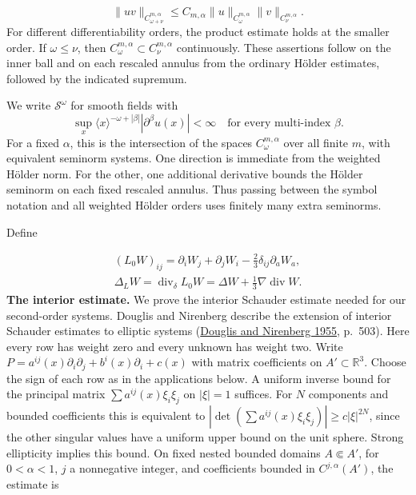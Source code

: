 \documentclass[
  english,
  11pt,
  reqno]{amsart}
\begin{document}
\label{eq:online-chart-weighted-product} \[
\|uv\|_{C^{m,\alpha}_{\omega+\nu}}
\le C_{m,\alpha}\|u\|_{C^{m,\alpha}_\omega}
\|v\|_{C^{m,\alpha}_\nu}.
\] For different differentiability orders, the product estimate holds at
the smaller order. If \(\omega\le\nu\), then
\(C^{m,\alpha}_\omega\subset C^{m,\alpha}_\nu\) continuously. These
assertions follow on the inner ball and on each rescaled annulus from
the ordinary Hölder estimates, followed by the indicated supremum.

We write \(\mathscr S^\omega\) for smooth fields with \[
\sup_x\langle x\rangle^{-\omega+|\beta|}
|\partial^\beta u(x)|<\infty
\quad\text{for every multi-index }\beta.
\] For a fixed \(\alpha\), this is the intersection of the spaces
\(C^{m,\alpha}_\omega\) over all finite \(m\), with equivalent seminorm
systems. One direction is immediate from the weighted Hölder norm. For
the other, one additional derivative bounds the Hölder seminorm on each
fixed rescaled annulus. Thus passing between the symbol notation and all
weighted Hölder orders uses finitely many extra seminorms.

Define

\label{eq:online-chart-flat-york-operators} \[
\begin{gathered}
(L_0W)_{ij}
=\partial_iW_j+\partial_jW_i
-\frac23\delta_{ij}\partial_aW_a, \\
\Delta_LW=\operatorname{div}_\delta L_0W
=\Delta W+\frac13\nabla\operatorname{div}W.
\end{gathered}
\] \textbf{The interior estimate.} We prove the interior Schauder
estimate needed for our second-order systems. Douglis and Nirenberg
describe the extension of interior Schauder estimates to elliptic
systems (\hyperref[ref-DouglisNirenberg1955]{Douglis and Nirenberg
1955}, p.~503). Here every row has weight zero and every unknown has
weight two. Write
\(P=a^{ij}(x)\partial_i\partial_j+b^i(x)\partial_i+c(x)\) with matrix
coefficients on \(A'\subset\mathbb R^3\). Choose the sign of each row as
in the applications below. A uniform inverse bound for the principal
matrix \(\sum a^{ij}(x)\xi_i\xi_j\) on \(|\xi|=1\) suffices. For \(N\)
components and bounded coefficients this is equivalent to
\(|\det (\sum a^{ij}(x)\xi_i\xi_j)|\ge c|\xi|^{2N}\), since the other
singular values have a uniform upper bound on the unit sphere. Strong
ellipticity implies this bound. On fixed nested bounded domains
\(A\Subset A'\), for \(0<\alpha<1\), \(j\) a nonnegative integer, and
coefficients bounded in \(C^{j,\alpha}(A')\), the estimate is
\end{document}
